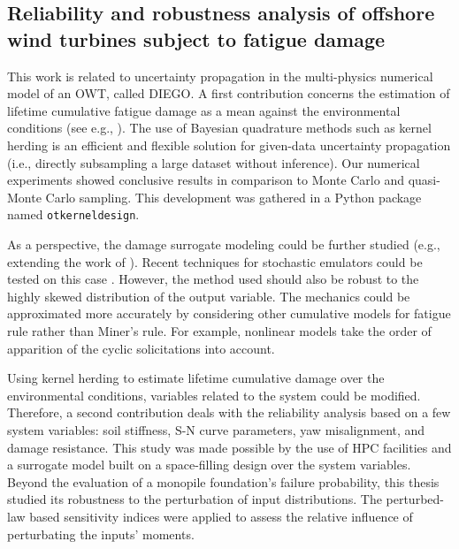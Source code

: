 \subsection*{Reliability and robustness analysis of offshore wind turbines subject to fatigue damage}

This work is related to uncertainty propagation in the multi-physics numerical model of an OWT, called DIEGO. 
A first contribution concerns the estimation of lifetime cumulative fatigue damage as a mean against the environmental conditions (see e.g., \citealp{muller_cheng_2018}). 
The use of Bayesian quadrature methods such as kernel herding \citep{chen_welling_2010,husar_duvenaud_2012} is an efficient and flexible solution for given-data uncertainty propagation (i.e., directly subsampling a large dataset without inference). 
Our numerical experiments showed conclusive results in comparison to Monte Carlo and quasi-Monte Carlo sampling. 
This development was gathered in a Python package named \texttt{otkerneldesign}. 

As a perspective, the damage surrogate modeling could be further studied (e.g., extending the work of \citealp{slot_sorensen_2020}). 
Recent techniques for stochastic emulators could be tested on this case \citep{baker_2022_stochastic_surrogates_review,zhu_2023_stochastic_pce,luthen_2023_stochastic_pce}.
However, the method used should also be robust to the highly skewed distribution of the output variable. 
The mechanics could be approximated more accurately by considering other cumulative models for fatigue rule rather than Miner's rule. 
For example, nonlinear models \citep{rocher_2020_nonlinear_fatigue} take the order of apparition of the cyclic solicitations into account.  

Using kernel herding to estimate lifetime cumulative damage over the environmental conditions, variables related to the system could be modified. 
Therefore, a second contribution deals with the reliability analysis based on a few system variables: soil stiffness, S-N curve parameters, yaw misalignment, and damage resistance.   
This study was made possible by the use of HPC facilities and a surrogate model built on a space-filling design over the system variables. 
Beyond the evaluation of a monopile foundation's failure probability, this thesis studied its robustness to the perturbation of input distributions.  
The perturbed-law based sensitivity indices \citep{lemaitre_2015_PLI} were applied to assess the relative influence of perturbating the inputs' moments. 


